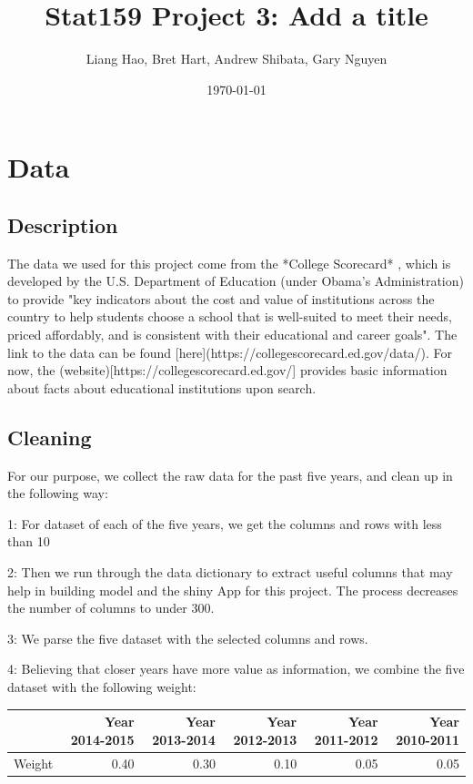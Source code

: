\documentclass{article}\usepackage[]{graphicx}\usepackage[]{color}
\title{Stat159 Project 3: Add a title}
\author{Liang Hao, Bret Hart, Andrew Shibata, Gary Nguyen}
\date{\today}
\begin{document}
\maketitle
\section{Data}



\subsection{Description}

The data we used for this project come from the *College Scorecard* , which is developed by the U.S. Department of Education (under Obama's Administration) to provide "key indicators about the cost and value of institutions across the country to help students choose a school that is well-suited to meet their needs, priced affordably, and is consistent with their educational and career goals". The link to the data can be found [here](https://collegescorecard.ed.gov/data/). For now, the (website)[https://collegescorecard.ed.gov/] provides basic information about facts about educational institutions upon search. 

\subsection{Cleaning}
For our purpose, we collect the raw data for the past five years, and clean up in the following way:

1: For dataset of each of the five years, we get the columns and rows with less than 10%

2: Then we run through the data dictionary to extract useful columns that may help in building model and the shiny App for this project. The process decreases the number of columns to under 300.

3: We parse the five dataset with the selected columns and rows.

4: Believing that closer years have more value as information, we combine the five dataset with the following weight:

\begin{table}[ht]
\centering
\begin{tabular}{rrrrrr}
  \hline
 & Year 2014-2015 & Year 2013-2014 & Year 2012-2013 & Year 2011-2012 & Year 2010-2011 \\ 
  \hline
Weight & 0.40 & 0.30 & 0.10 & 0.05 & 0.05 \\ 
   \hline
\end{tabular}
\end{table}
\end{document}
